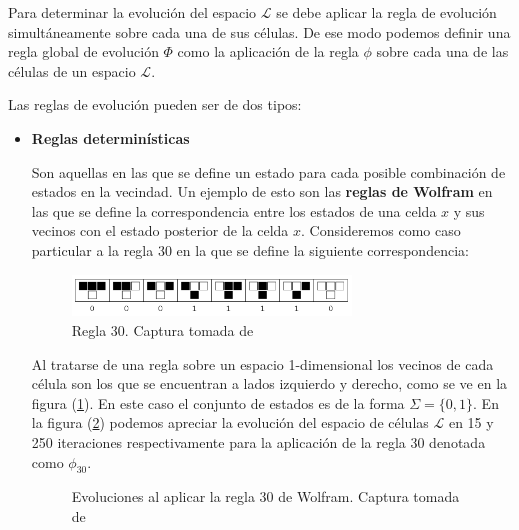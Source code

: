 Para determinar la evolución del espacio $\mathcal{L}$ se debe aplicar la regla de evolución simultáneamente sobre cada una de sus células. De ese modo podemos definir una regla global de evolución $\Phi$ como la aplicación de la regla $\phi$ sobre cada una de las células de un espacio $\mathcal{L}$.

Las reglas de evolución pueden ser de dos tipos:

\begin{itemize}
    \item \textbf{Reglas determinísticas}
    
    Son aquellas en las que se define un estado para cada posible combinación de estados en la vecindad. Un ejemplo de esto son las \textbf{reglas de Wolfram} en las que se define la correspondencia entre los estados de una celda $x$ y sus vecinos con el estado posterior de la celda $x$. Consideremos como caso particular a la regla 30 en la que se define la siguiente correspondencia:
    
    \begin{figure}[h]
      \centering
        \includegraphics[width=0.7\textwidth]{Imagenes/regla30.PNG}
      \caption{Regla 30. Captura tomada de \cite{rule30}}
      \label{fig:Regla30}
    \end{figure}
    
    Al tratarse de una regla sobre un espacio 1-dimensional los vecinos de cada célula son los que se encuentran a lados izquierdo y derecho, como se ve en la figura (\ref{fig:Regla30}). En este caso el conjunto de estados es de la forma $\Sigma=\{0,1\}$. En la figura (\ref{fig:regla30en15y250}) podemos apreciar la evolución del espacio de células $\mathcal{L}$ en 15 y 250 iteraciones respectivamente para la aplicación de la regla 30 denotada como $\phi_{30}$.
    
    \begin{figure}[htbp]
        \centering
        \caption{Evoluciones al aplicar la regla 30 de Wolfram. Captura tomada de \cite{rule30}}\label{fig:regla30en15y250}
    \end{figure}
    

\end{itemize}
